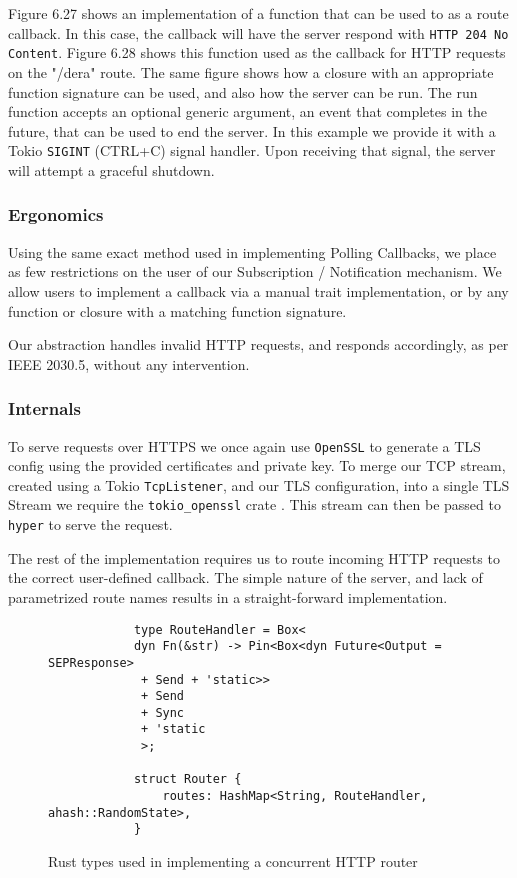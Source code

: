 Figure 6.27 shows an implementation of a function that can be used to as a route callback. In this case, the callback will have the server respond with \texttt{HTTP 204 No Content}. Figure 6.28 shows this function used as the callback for HTTP requests on the "/dera" route. The same figure shows how a closure with an appropriate function signature can be used, and also how the server can be run. 
The run function accepts an optional generic argument, an event that completes in the future, that can be used to end the server. In this example we provide it with a Tokio \texttt{SIGINT} (CTRL+C) signal handler. Upon receiving that signal, the server will attempt a graceful shutdown.

\subsubsection{Ergonomics}
Using the same exact method used in implementing Polling Callbacks, we place as few restrictions on the user of our Subscription / Notification mechanism. We allow users to implement a callback via a manual trait implementation, or by any function or closure with a matching function signature.

Our abstraction handles invalid HTTP requests, and responds accordingly, as per IEEE 2030.5, without any intervention.

\subsubsection{Internals}
To serve requests over HTTPS we once again use \texttt{OpenSSL} to generate a TLS config using the provided certificates and private key. To merge our TCP stream, created using a Tokio \texttt{TcpListener}, and our TLS configuration, into a single TLS Stream we require the \texttt{tokio\_openssl} crate \cite{tokioopenssl}. This stream can then be passed to \texttt{hyper} to serve the request.

The rest of the implementation requires us to route incoming HTTP requests to the correct user-defined callback. The simple nature of the server, and lack of parametrized route names results in a straight-forward implementation.

\begin{figure}[h]
    \begin{center}
        \begin{lstlisting}
            type RouteHandler = Box<
            dyn Fn(&str) -> Pin<Box<dyn Future<Output = SEPResponse>
             + Send + 'static>>
             + Send
             + Sync
             + 'static
             >;

            struct Router {
                routes: HashMap<String, RouteHandler, ahash::RandomState>,
            }

        \end{lstlisting}
        \label{fig:routerimpl}
        \vspace{-10pt}
        \caption{Rust types used in implementing a concurrent HTTP router}
    \end{center}
\end{figure}

